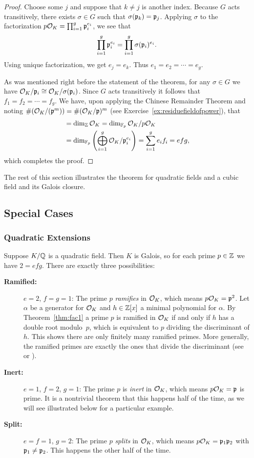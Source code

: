\begin{proof}
Choose some $j$ and suppose that $k\neq j$ is another index.  Because
$G$ acts transitively, there exists $\sigma\in G$ such that
$\sigma(\mathfrak{p}_k)=\mathfrak{p}_j$.  Applying $\sigma$ to the factorization $p\mathcal{O}_K =
\prod_{i=1}^g \mathfrak{p}_i^{e_i}$, we see that
$$\prod_{i=1}^g \mathfrak{p}_i^{e_i} = \prod_{i=1}^g \sigma(\mathfrak{p}_i)^{e_i}.$$
Using unique factorization,
we get $e_j = e_k$.  Thus $e_1=e_2=\cdots = e_g$.

As was mentioned right before the statement of the theorem,  for any $\sigma\in G$
we have $\mathcal{O}_K/\mathfrak{p}_i\cong \mathcal{O}_K/\sigma(\mathfrak{p}_i)$. Since $G$ acts transitively
it follows that $f_1=f_2=\cdots = f_g$.
We have, upon applying the Chinese Remainder Theorem
and noting $\#(\mathcal{O}_K/(\mathfrak{p}^m)) = \#(\mathcal{O}_K/\mathfrak{p})^m$
(see Exercise~\ref{ex:residuefieldofpower}), that
\begin{align*}
[K:\Q]&= \dim_{\Z} \O_K = \dim_{\F_p} \O_K/p\O_K\\
    &= \dim_{\F_p} \left(\bigoplus_{i=1}^g \O_K/\p_i^{e_i}\right)
    = \sum_{i=1}^g e_i f_i
    = efg,
\end{align*}
which completes the proof.
\end{proof}

The rest of this section illustrates the theorem for quadratic fields
and a cubic field and its Galois closure.

\subsection{Special Cases}

\subsubsection*{Quadratic Extensions}

Suppose $K/\mathbb{Q}$ is a quadratic field.  Then $K$ is Galois, so for each prime $p\in\mathbb{Z}$ we have
$2=efg$. There are exactly three possibilities:
\begin{description}
\item[\bf{Ramified:}] $e=2$, $f=g=1$: The prime $p$ \emph{ramifies} in
$\mathcal{O}_K$, which means $p\mathcal{O}_K = \mathfrak{p}^2$.  Let $\alpha$ be a generator for $\mathcal{O}_K$ and
$h\in\mathbb{Z}[x]$ a minimal polynomial for $\alpha$.
By Theorem~\ref{thm:fac1} a prime $p$ is ramified in $\mathcal{O}_K$ if and only if
$h$ has a double root modulo~$p$, which is equivalent to $p$ dividing
the discriminant of $h$. This shows there are only finitely many ramified
primes. More generally, the ramified primes are exactly the
ones that divide the discriminant (see \cite[Thm.~24]{marcus1977number}
or
\cite[Cor.~III.2.12]{neukirch1999}).

\item[\bf{Inert}:] $e=1$, $f=2$, $g=1$: The prime $p$ is \emph{inert} in $\mathcal{O}_K$,
which means $p\mathcal{O}_K = \mathfrak{p}$ is prime.  It is a nontrivial theorem that
this happens half of the time,
as we will see illustrated below for a particular example.

\item[\bf{Split:}] $e=f=1$, $g=2$: The prime $p$ \emph{splits} in $\mathcal{O}_K$,
which means $p\mathcal{O}_K = \mathfrak{p}_1\mathfrak{p}_2$ with $\mathfrak{p}_1\neq \mathfrak{p}_2$.  This happens the other
half of the time.
\end{description}

